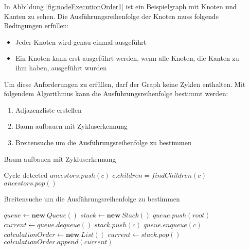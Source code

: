 In Abbildung \ref{fig:nodeExecutionOrder1} ist ein Beispielgraph mit Knoten und Kanten zu sehen. Die Ausführungsreihenfolge der Knoten muss folgende Bedingungen erfüllen:
\begin{itemize}
    \item Jeder Knoten wird genau einmal ausgeführt
    \item Ein Knoten kann erst ausgeführt werden, wenn alle Knoten, die Kanten zu ihm haben, ausgeführt wurden
\end{itemize}

Um diese Anforderungen zu erfüllen, darf der Graph keine Zyklen enthalten. Mit folgendem Algorithmus kann die Ausführungsreihenfolge bestimmt werden:
\begin{enumerate}
    \item Adjazenzliste erstellen
    \item Baum aufbauen mit Zykluserkennung
    \item Breitensuche um die Ausführungsreihenfolge zu bestimmen 
\end{enumerate}

\begin{algorithm}[H]
    \caption{Baum aufbauen mit Zykluserkennung}
    \begin{algorithmic}[1]
                    \State Cycle detected
                \EndIf
                \State $ancestors.push(c)$
                \State $c.children = findChildren(c)$
                \State {}
                \State $ancestors.pop()$
            \EndFor
        \EndFunction
    \end{algorithmic}
\end{algorithm}

\begin{algorithm}[H]
    \caption{Breitensuche um die Ausführungsreihenfolge zu bestimmen}
    \begin{algorithmic}[1]
        \State $queue \gets \textbf{new} \ Queue()$
        \State $stack \gets \textbf{new} \ Stack()$
        \State $queue.push(root)$
            \State $current \gets queue.dequeue()$
                \State $stack.push(c)$
                \State $queue.enqueue(c)$
            \EndFor
        \EndWhile
        \State $calculationOrder \gets \textbf{new} \ List()$
            \State $current \gets stack.pop()$
                \State $calculationOrder.append(current)$
            \EndIf
        \EndWhile
    \end{algorithmic}
\end{algorithm}

